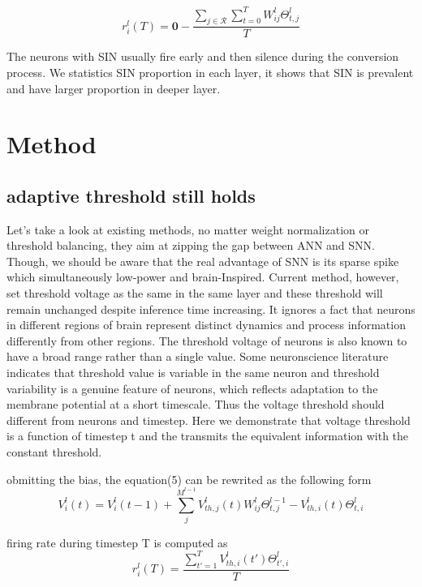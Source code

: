 \documentclass{article}
\begin{document}
\begin{equation}
  r_i^l(T) = \mathbf{0} - \frac{\sum_{j \in \mathcal{R}} \sum_{t=0}^TW_{ij}^l\Theta_{t,j}^l }{T}
\end{equation}

The neurons with SIN usually fire early and then silence during the conversion process.
We statistics SIN proportion in each layer, it shows that SIN is prevalent and have larger proportion in deeper layer.
\section{Method}
\subsection{adaptive threshold still holds}
Let's take a look at existing methods, no matter weight normalization or threshold balancing, they aim at zipping the gap between ANN and SNN. Though, we should be aware that
the real advantage of SNN is its sparse spike which simultaneously low-power and brain-Inspired. Current method, however, set threshold voltage as the same in the same layer and 
these threshold will remain unchanged despite inference time increasing. It ignores a fact that neurons in different
regions of brain represent distinct dynamics and process information differently from other regions. 
The threshold voltage of neurons is also known to have a broad
range rather than a single value. Some neuronscience literature indicates that threshold value 
is variable in the same neuron and threshold 
variability is a genuine feature of neurons, which reflects 
adaptation to the membrane potential at a short 
timescale. Thus the voltage threshold should different from neurons and timestep. Here we demonstrate that voltage threshold is a function of timestep t and the transmits the equivalent information with the constant threshold.

obmitting the bias, the equation(5) can be rewrited as the following form
\begin{equation}
  V_i^l(t)=V_{i}^{l}(t-1)+\sum_j^{M^{l-1}}V_{th,j}^l(t)W_{ij}^l\Theta_{t,j}^{l-1} -V_{th,i}^l(t)\Theta_{t,i}^{l}
\end{equation}

firing rate during timestep T is computed as 
\begin{equation}
  r_i^l(T) = \frac{\sum_{t'=1}^{T}V_{th,i}^l(t')\Theta_{t',i}^{l}}{T}
\end{equation}
\end{document}
